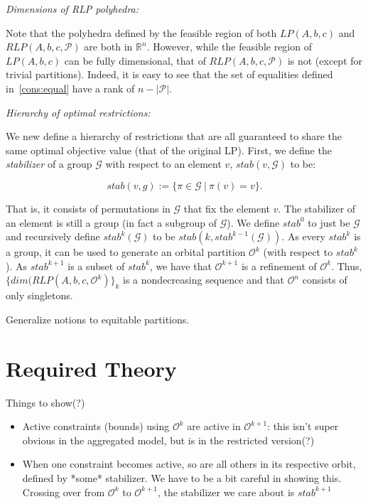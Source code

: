 \documentclass[runningheads]{llncs}
\newcommand{\cP}{{\mathcal P}}
\newcommand{\cG}{{\mathcal G}}
\newcommand{\cO}{{\mathcal O}}
\begin{document}
{\em Dimensions of RLP polyhedra:}

Note that the polyhedra defined by the feasible region of both $LP(A,b,c)$ and
$RLP(A,b,c,\cP)$ are both in $\mathbb{R}^n$. However, while the feasible
region of $LP(A,b,c)$ can be fully dimensional, that of $RLP(A,b,c,\cP)$ is not
(except for trivial partitions). Indeed, it is easy to see that the set of
equalities defined in~\eqref{cons:equal} have a rank of $n - |\cP|$.

{\em Hierarchy of  optimal restrictions:}

We new define a hierarchy of restrictions that are all guaranteed to share the
same optimal objective value (that of the original LP). First, we define the {\em
  stabilizer} of a group $\cG$ with respect to an element $v$, $stab(v,\cG)$ to
be:

$$stab(v,g) := \{ \pi \in \cG\ | \ \pi(v) = v\}.$$ 

\noindent That is, it consists of permutations in $\cG$ that fix the element
$v$. The stabilizer of an element is still a group (in fact a subgroup of
$\cG$). We define $stab^0$ to just be $\cG$ and recursively define $stab^k(\cG)$
to be $stab( k , stab^{k-1}(\cG))$. As every $stab^k$ is a group, it can be used
to generate an orbital partition $\cO^k$ (with respect to $stab^k$). As $stab^{k+1}$
is a subset of $stab^k$, we have that $\cO^{k+1}$ is a refinement of $\cO^k$.
Thus, $\{dim(RLP(A,b,c,\cO^k)\}_{ k }$ is a nondecreasing
sequence and that $\cO^n$ consists of only singletons.


Generalize notions to equitable partitions.

\section{Required Theory}

Things to show(?)
\begin{itemize}
\item Active constraints (bounds) using $\cO^k$ are active in $\cO^{k+1}$: this isn't
  super obvious in the aggregated model, but is in the restricted version(?)
  \item When one constraint becomes active, so are all others in its respective
    orbit, defined by *some* stabilizer. We have to be a bit careful in showing
    this. Crossing over  from $\cO^k$ to $\cO^{k+1}$, the stabilizer we care
    about is $stab^{k+1}$

    \end{itemize}
\end{document}
